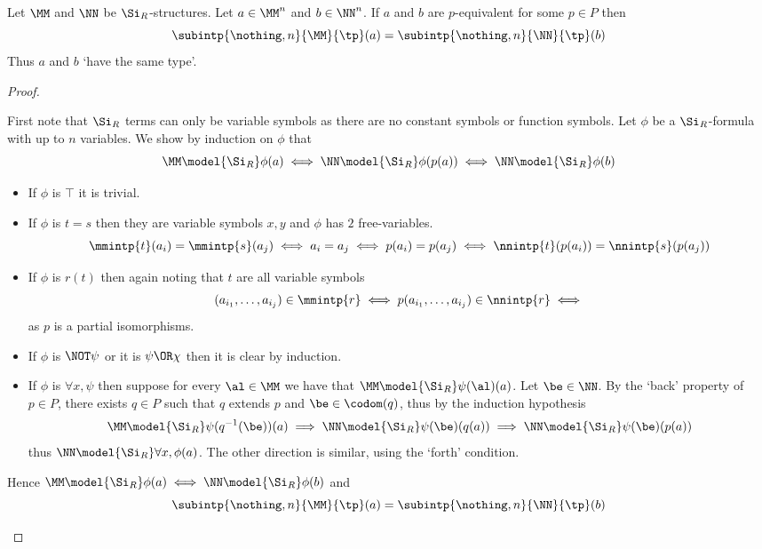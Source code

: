 \begin{prop}%
    Let $\MM$ and $\NN$ be $\Si_R$-structures.
    Let $a \in \MM^{n}$ and $b \in \NN^{n}$.
    If $a$ and $b$ are $p$-equivalent for some $p \in P$ then
    \[\subintp{\nothing,n}{\MM}{\tp}(a) = 
    \subintp{\nothing,n}{\NN}{\tp}(b)\]
    Thus $a$ and $b$ `have the same type'.
\end{prop}
\begin{proof}
    \begin{forward}
    First note that $\Si_R$ terms can only be variable symbols as there are no 
    constant symbols or function symbols.
    Let $\phi$ be a $\Si_R$-formula with up to $n$ variables.
    We show by induction on $\phi$ that 
    \[
        \MM \model{\Si_R} \phi(a)
        \iff \NN \model{\Si_R} \phi(p(a))
        \iff \NN \model{\Si_R} \phi(b)
    \]
    \begin{itemize}
        \item If $\phi$ is $\top$ it is trivial.
        \item If $\phi$ is $t = s$ then they are variable symbols $x,y$
            and $\phi$ has $2$ free-variables. 
            \[
                \mmintp{t}(a_i) = \mmintp{s}(a_j)
                \iff a_i = a_j \iff p(a_i) = p(a_j) 
                \iff \nnintp{t}(p(a_i)) = \nnintp{s}(p(a_j))
            \]
        \item If $\phi$ is $r(t)$ then again noting that $t$ are all variable
            symbols
            \[  
                (a_{i_1},\dots,a_{i_j}) \in \mmintp{r} \iff 
                p(a_{i_1},\dots,a_{i_j}) \in \nnintp{r} \iff 
            \]
            as $p$ is a partial isomorphisms.
        \item If $\phi$ is $\NOT \psi$ or it is $\psi \OR \chi$ then it is 
            clear by induction.
        \item If $\phi$ is $\forall x, \psi$ 
            then suppose for every $\al \in \MM$ we have that 
            $\MM \model{\Si_R} \psi(\al)(a)$.
            Let $\be \in \NN$. 
            By the `back' property of $p \in P$, 
            there exists $q \in P$ such that $q$ extends $p$ and 
            $\be \in \codom(q)$, thus by the induction hypothesis
            \[
                \MM \model{\Si_R} \psi(q^{-1}(\be))(a) 
                \implies \NN \model{\Si_R} \psi(\be)(q(a))
                \implies \NN \model{\Si_R} \psi(\be)(p(a))
            \]
            thus $\NN \model{\Si_R} \forall x, \phi(a)$.
            The other direction is similar, 
            using the `forth' condition.
    \end{itemize}
    Hence $\MM \model{\Si_R} \phi(a)\iff \NN \model{\Si_R} \phi(b)$ and
    \[
        \subintp{\nothing,n}{\MM}{\tp}(a) = 
        \subintp{\nothing,n}{\NN}{\tp}(b)
    \]
    \end{forward}


\end{proof}
